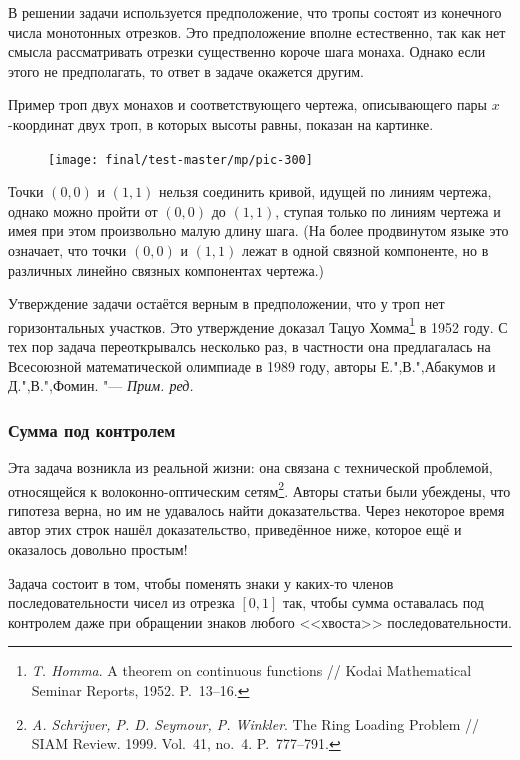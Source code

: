 \documentclass[twoside]{book}
\newenvironment{addedbytheeditors}{\par\medskip\small
}{\par\addvspace{\medskipamount}} %
\begin{document}
\begin{addedbytheeditors}
В решении задачи используется предположение, что тропы состоят из конечного числа монотонных отрезков.
Это предположение вполне естественно, так как нет смысла рассматривать отрезки существенно короче шага монаха.
Однако если этого не предполагать, то ответ в задаче окажется другим.

Пример троп двух монахов и соответствующего чертежа, описывающего пары $x$-координат двух троп, в которых высоты равны, показан на картинке.
\begin{figure}[ht!]
\vskip-0mm
\centering
\texttt{[image: final/test-master/mp/pic-300]}
\end{figure}
Точки $(0,0)$ и $(1,1)$ нельзя соединить кривой, идущей по линиям чертежа, 
однако можно пройти от $(0,0)$ до $(1,1)$, ступая только по линиям чертежа и имея при этом произвольно малую длину шага.
(На более продвинутом языке это означает, что точки $(0,0)$ и $(1,1)$ лежат в одной связной компоненте, но в различных линейно связных компонентах чертежа.)

Утверждение задачи остаётся верным в предположении, что у троп нет горизонтальных участков.
Это утверждение доказал Тацуо Хомма\footnote{\emph{T. Homma}. A theorem on continuous functions /\!/ Kodai Mathematical Seminar Reports, 1952. P.~13--16.}
в 1952 году.
С тех пор задача переоткрывалсь несколько раз, в частности она
предлагалась на Всесоюзной математической олимпиаде в 1989 году,
авторы Е.",В.",Абакумов и Д.",В.",Фомин. 
"--- \emph{Прим. ред.}  
\end{addedbytheeditors}

\subsubsection*{Сумма под контролем}

Эта задача возникла из реальной жизни: она связана с технической
проблемой, относящейся к волоконно-оптическим
сетям\footnote{\emph{A. Schrijver, P. D. Seymour, P. Winkler}. The Ring Loading Problem /\!/ {SIAM Review}. 1999. Vol.~41, no.~4. P.~777--791.}.
Авторы статьи были убеждены, что гипотеза
верна, но им не удавалось найти доказательства. Через некоторое время
автор этих строк нашёл доказательство, приведённое ниже, которое ещё и
оказалось довольно простым!

\medskip

Задача состоит в том, чтобы поменять знаки у каких-то членов
последовательности чисел из отрезка $[0,1]$ так, чтобы сумма
оставалась под контролем даже при обращении знаков любого <<хвоста>>
последовательности.
\end{document}
